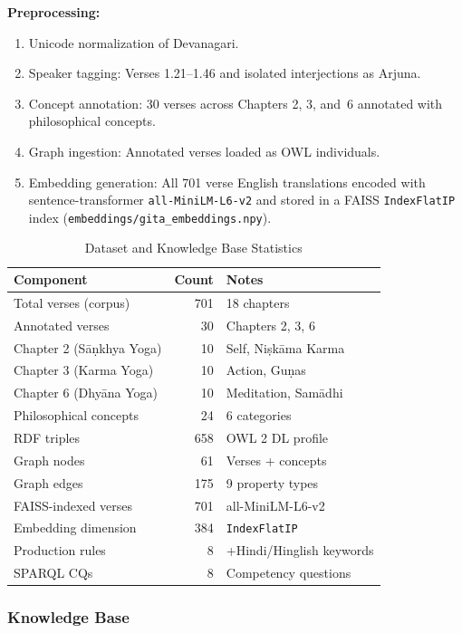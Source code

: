 \documentclass[conference]{IEEEtran}
\begin{document}
\textbf{Preprocessing:}
\begin{enumerate}[leftmargin=*]
  \item Unicode normalization of Devanagari.
  \item Speaker tagging: Verses 1.21--1.46 and isolated interjections as Arjuna.
  \item Concept annotation: 30 verses across Chapters 2, 3, and~6 annotated
        with philosophical concepts.
  \item Graph ingestion: Annotated verses loaded as OWL individuals.
  \item Embedding generation: All 701 verse English translations encoded with
        sentence-transformer \texttt{all-MiniLM-L6-v2} and stored in a FAISS
        \texttt{IndexFlatIP} index (\texttt{embeddings/gita\_embeddings.npy}).
\end{enumerate}

\begin{table}[htbp]
\caption{Dataset and Knowledge Base Statistics}
\label{tab:dataset}
\centering
\begin{tabular}{lrp{2.8cm}}
\toprule
\textbf{Component} & \textbf{Count} & \textbf{Notes} \\
\midrule
Total verses (corpus) & 701 & 18 chapters \\
Annotated verses & 30 & Chapters 2, 3, 6 \\
\quad Chapter 2 (S\={a}\d{n}khya Yoga) & 10 & Self, Ni\d{s}k\={a}ma Karma \\
\quad Chapter 3 (Karma Yoga) & 10 & Action, Gu\d{n}as \\
\quad Chapter 6 (Dhy\={a}na Yoga) & 10 & Meditation, Sam\={a}dhi \\
Philosophical concepts & 24 & 6 categories \\
RDF triples & 658 & OWL 2 DL profile \\
Graph nodes & 61 & Verses + concepts \\
Graph edges & 175 & 9 property types \\
FAISS-indexed verses & 701 & all-MiniLM-L6-v2 \\
Embedding dimension & 384 & \texttt{IndexFlatIP} \\
Production rules & 8 & +Hindi/Hinglish keywords \\
SPARQL CQs & 8 & Competency questions \\
\bottomrule
\end{tabular}
\end{table}

\subsubsection{Knowledge Base}
\end{document}
